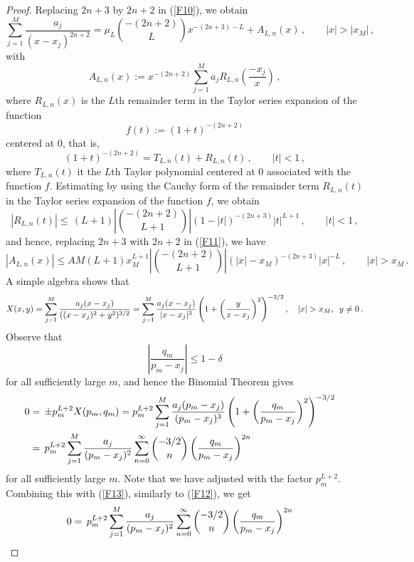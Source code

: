 \documentclass{article}
\theoremstyle{remark}
\numberwithin{equation}{section}
\begin{document}
\begin{proof}
Replacing $2n+3$ by $2n+2$ in (\ref{F10}), we obtain
\begin{equation} \label{F13}
\sum_{j=1}^M{\frac{a_j}{(x-x_j)^{2n+2}}} = \mu_L \binom{-(2n+2)}{L}x^{-(2n+3)-L} + A_{L,n}(x)\,, \qquad |x| > |x_M|\,,
\end{equation}
with
$$A_{L,n}(x) := x^{-(2n+2)}\sum_{j=1}^M{a_j R_{L,n}\left( \frac{-x_j}{x} \right)}\,,$$
where $R_{L,n}(x)$ is the $L$th remainder term in the Taylor series expansion of the function 
$$f(t) := (1+t)^{-(2n+2)}$$ 
centered at $0$, that is,
$$(1+t)^{-(2n+2)} = T_{L,n}(t) + R_{L,n}(t)\,, \qquad |t| < 1\,,$$
where $T_{L,n}(t)$ it the $L$th Taylor polynomial centered at $0$ associated with the function $f$.
Estimating by using the Cauchy form of the remainder term $R_{L,n}(t)$ in the Taylor series expansion of the function $f$, we obtain
$$|R_{L,n}(t)| \leq \, (L+1) \left| \binom{-(2n+2)}{L+1} \right| (1-|t|)^{-(2n+3)}|t|^{L+1}\,, \qquad |t| < 1\,,$$
and hence, replacing $2n+3$ with $2n+2$ in (\ref{F11}), we have
\begin{equation}\label{F14}
|A_{L,n}(x)| \leq AM(L+1)x_M^{L+1} \left| \binom{-(2n+2)}{L+1} \right| \left( |x| - x_M \right)^{-(2n+3)} |x|^{-L}\,, \qquad |x| > x_M\,.
\end{equation}
A simple algebra shows that
$$X(x,y) = \sum_{j=1}^M{\frac{a_j(x-x_j)}{((x-x_j)^2 + y^2)^{3/2}}} =
\sum_{j=1}^M{\frac{a_j(x-x_j)}{|x-x_j|^3} \left( 1 +  \left( \frac{y}{x-x_j} \right)^2 \right)^{-3/2}}\,, \quad |x| > x_M, \enskip y \neq 0\,.$$
Observe that
$$\left| \frac{q_m}{p_m-x_j} \right| \leq 1-\delta$$
for all sufficiently large $m$, and hence the Binomial Theorem gives
\begin{equation} \notag \begin{split}
0 & = \, \pm p_m^{L+2}X(p_m,q_m) = p_m^{L+2} \sum_{j=1}^M{\frac{a_j(p_m-x_j)}{(p_m-x_j)^3} \left( 1 +  \left( \frac{q_m}{p_m-x_j} \right)^2 \right)^{-3/2}} \cr
& = \, p_m^{L+2} \sum_{j=1}^M{\frac{a_j}{(p_m-x_j)^2} \sum_{n=0}^\infty{\binom{-3/2}{n} \left( \frac{q_m}{p_m-x_j} \right)^{2n}}} \cr
\end{split} \end{equation}
for all sufficiently large $m$. Note that we have adjusted with the factor $p_m^{L+2}$. Combining this with (\ref{F13}), similarly to (\ref{F12}), we get
\begin{equation} \label{F15}
\begin{split} 0 & = \, p_m^{L+2} \sum_{j=1}^M{\frac{a_j}{(p_m-x_j)^2} \sum_{n=0}^\infty{\binom {-3/2}{n} \left( \frac{q_m}{p_m-x_j} \right)^{2n}}} \cr

\end{split}
\end{equation}
\end{proof}
\end{document}
